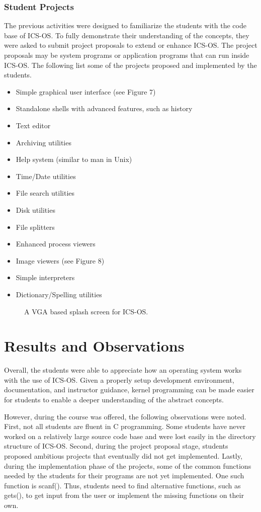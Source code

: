 \documentclass{acm_proc_article-sp}
\begin{document}
\subsubsection{Student Projects}
The previous activities were designed to familiarize the students with
the code base of ICS-OS. To fully demonstrate their understanding of the 
concepts, they were asked to submit project proposals to extend or enhance
ICS-OS. The project proposals may be system programs or application programs
that can run inside ICS-OS. The following list some of the projects proposed
and implemented by the students.

\begin{itemize}
\item{Simple graphical user interface (see Figure 7)}
\item{Standalone shells with advanced features, such as history}
\item{Text editor}
\item{Archiving utilities}
\item{Help system (similar to man in Unix)}
\item{Time/Date utilities}
\item{File search utilities}
\item{Disk utilities}
\item{File splitters}
\item{Enhanced process viewers}
\item{Image viewers (see Figure 8)}
\item{Simple interpreters}
\item{Dictionary/Spelling utilities}
\end{itemize}

\begin{figure}
\centering
{}
\caption{A VGA based splash screen for ICS-OS.}
\end{figure}



\section{Results and Observations}
Overall, the students were able to appreciate how an operating system works
with the use of ICS-OS. Given a properly setup development environment, 
documentation, and instructor guidance, kernel programming can be made easier
for students to enable a deeper understanding of the abstract concepts. 

However, during the course was offered, the following observations were noted.
First, not all students are fluent in C programming. Some students have never
worked on a relatively large source code base and were lost easily in the 
directory structure of ICS-OS. Second, during the project proposal stage,
students proposed ambitious projects that eventually did not get implemented.
Lastly, during the implementation phase of the projects, some of the 
common functions needed by the students for their programs are not yet
implemented. One such function is scanf(). Thus, students need to find
alternative functions, such as gets(), to get input from the user or 
implement the missing functions on their own.
\end{document}
